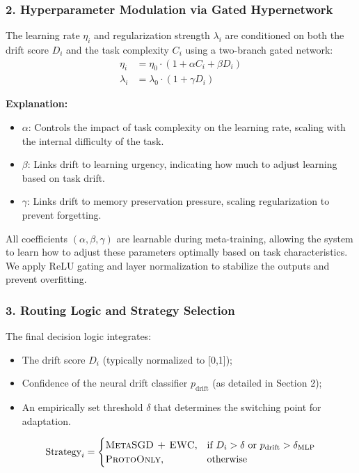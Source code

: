 \documentclass[conference]{IEEEtran}
\begin{document}
\subsubsection*{2. Hyperparameter Modulation via Gated Hypernetwork}

The learning rate $\eta_i$ and regularization strength $\lambda_i$ are conditioned on both the drift score $D_i$ and the task complexity $C_i$ using a two-branch gated network:
\begin{align}
    \eta_i &= \eta_0 \cdot \left(1 + \alpha C_i + \beta D_i \right) \\
    \lambda_i &= \lambda_0 \cdot \left(1 + \gamma D_i \right)
\end{align}

\textbf{Explanation:}
\begin{itemize}
    \item $\alpha$: Controls the impact of task complexity on the learning rate, scaling with the internal difficulty of the task.
    \item $\beta$: Links drift to learning urgency, indicating how much to adjust learning based on task drift.
    \item $\gamma$: Links drift to memory preservation pressure, scaling regularization to prevent forgetting.
\end{itemize}

All coefficients $(\alpha, \beta, \gamma)$ are learnable during meta-training, allowing the system to learn how to adjust these parameters optimally based on task characteristics. We apply ReLU gating and layer normalization to stabilize the outputs and prevent overfitting.

\subsubsection*{3. Routing Logic and Strategy Selection}

The final decision logic integrates:
\begin{itemize}
    \item The drift score $D_i$ (typically normalized to [0,1]);
    \item Confidence of the neural drift classifier $p_{\text{drift}}$ (as detailed in Section 2);
    \item An empirically set threshold $\delta$ that determines the switching point for adaptation.
\end{itemize}

\[
\text{Strategy}_i = 
\begin{cases}
\textsc{MetaSGD + EWC}, & \text{if } D_i > \delta \text{ or } p_{\text{drift}} > \delta_{\text{MLP}} \\
\textsc{ProtoOnly}, & \text{otherwise}
\end{cases}
\]
\end{document}
